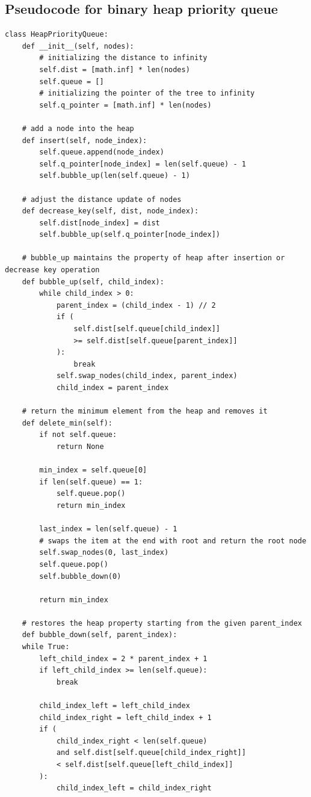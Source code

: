\documentclass[12pt]{article}
\begin{document}
\subsection{Pseudocode for binary heap priority queue}
\begin{lstlisting}[style=mystyle]
    class HeapPriorityQueue:
    def __init__(self, nodes):
        # initializing the distance to infinity
        self.dist = [math.inf] * len(nodes)
        self.queue = []
        # initializing the pointer of the tree to infinity
        self.q_pointer = [math.inf] * len(nodes)

    # add a node into the heap
    def insert(self, node_index):
        self.queue.append(node_index)
        self.q_pointer[node_index] = len(self.queue) - 1
        self.bubble_up(len(self.queue) - 1)

    # adjust the distance update of nodes
    def decrease_key(self, dist, node_index):
        self.dist[node_index] = dist
        self.bubble_up(self.q_pointer[node_index])

    # bubble_up maintains the property of heap after insertion or decrease key operation
    def bubble_up(self, child_index):
        while child_index > 0:
            parent_index = (child_index - 1) // 2
            if (
                self.dist[self.queue[child_index]]
                >= self.dist[self.queue[parent_index]]
            ):
                break
            self.swap_nodes(child_index, parent_index)
            child_index = parent_index

    # return the minimum element from the heap and removes it
    def delete_min(self):
        if not self.queue:
            return None

        min_index = self.queue[0]
        if len(self.queue) == 1:
            self.queue.pop()
            return min_index

        last_index = len(self.queue) - 1
        # swaps the item at the end with root and return the root node
        self.swap_nodes(0, last_index)
        self.queue.pop() 
        self.bubble_down(0)

        return min_index

    # restores the heap property starting from the given parent_index
    def bubble_down(self, parent_index):
    while True:
        left_child_index = 2 * parent_index + 1
        if left_child_index >= len(self.queue):
            break

        child_index_left = left_child_index
        child_index_right = left_child_index + 1
        if (
            child_index_right < len(self.queue)
            and self.dist[self.queue[child_index_right]]
            < self.dist[self.queue[left_child_index]]
        ):
            child_index_left = child_index_right


\end{lstlisting}
\end{document}

